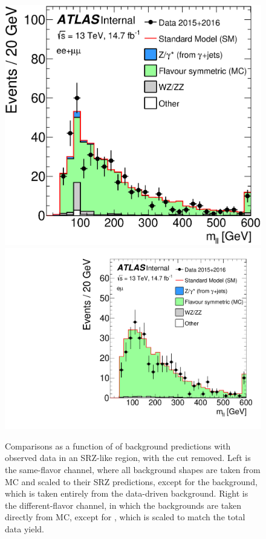 \begin{centering}
\begin{figure}[!hbt]
\myfloatalign
\includegraphics[width=.48\linewidth]{figures/results/mll_SF_R_a_SCALED.eps}
\includegraphics[width=.48\linewidth]{figures/results/mll_DF_R_a_SCALED.pdf}
\caption{Comparisons as a function of \mll of background predictions with observed data in an SRZ-like region, with the \mll cut removed. Left is the same-flavor channel, where all background shapes are taken from \ac{MC} and scaled to their SRZ predictions, except for the \dyjets background, which is taken entirely from the data-driven background. Right is the different-flavor channel, in which the backgrounds are taken directly from \ac{MC}, except for \ttbar, which is scaled to match the total data yield. }
\label{fig:results_widemll}
\end{figure}
\end{centering}

